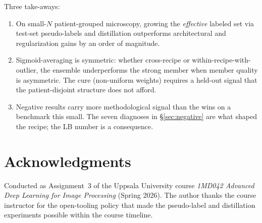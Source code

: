 \documentclass[conference]{IEEEtran}
\begin{document}
Three take-aways:
\begin{enumerate}
  \item On small-$N$ patient-grouped microscopy, growing the \emph{effective} labeled set via test-set pseudo-labels and distillation outperforms architectural and regularization gains by an order of magnitude.
  \item Sigmoid-averaging is symmetric: whether cross-recipe or within-recipe-with-outlier, the ensemble underperforms the strong member when member quality is asymmetric. The cure (non-uniform weights) requires a held-out signal that the patient-disjoint structure does not afford.
  \item Negative results carry more methodological signal than the wins on a benchmark this small. The seven diagnoses in \S\ref{sec:negative} are what shaped the recipe; the LB number is a consequence.
\end{enumerate}

\section*{Acknowledgments}

Conducted as Assignment~3 of the Uppsala University course \emph{1MD042 Advanced Deep Learning for Image Processing} (Spring 2026). The author thanks the course instructor for the open-tooling policy that made the pseudo-label and distillation experiments possible within the course timeline.



\end{document}
